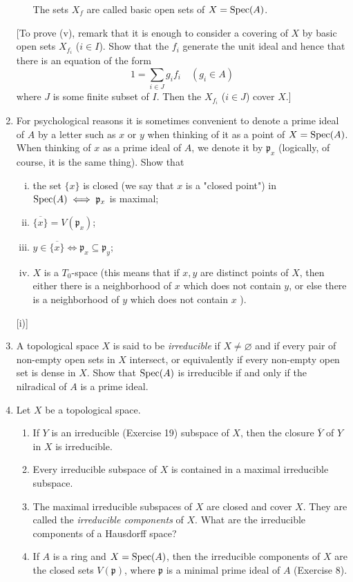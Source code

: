 \documentclass[class=book, crop=false]{standalone}
\theoremstyle{definition}
\theoremstyle{remark}
\begin{document}
\begin{enumerate}[resume*=exc1]
\begin{enumerate}[i)]
The sets $X_{f}$ are called basic open sets of $X=\operatorname{Spec}(A)$.
\end{enumerate}
[To prove (v), remark that it is enough to consider a covering of $X$ by basic
open sets $X_{f_{i}}$ ($i \in I$). Show that the $f_{i}$ generate the unit ideal
and hence that there is an equation of the form
\[
  1=\sum_{i \in J} g_{i} f_{i} \quad\left(g_{i} \in A\right)
\]
where $J$ is some finite subset of $I$. Then the $X_{f_{i}}$ ($i \in J$) cover
$X$.]

\item For psychological reasons it is sometimes convenient to denote a prime
ideal of $A$ by a letter such as $x$ or $y$ when thinking of it as a point of
$X=\operatorname{Spec}(A)$. When thinking of $x$ as a prime ideal of $A$, we
denote it by $\mathfrak{p}_{x}$ (logically, of course, it is the same thing).
Show that
\begin{enumerate}[i)]
  \item the set $\{x\}$ is closed (we say that $x$ is a "closed point") in
$\operatorname{Spec}(A) \iff \mathfrak{p}_{x}$ is maximal;
  \item $\overline{\{x\}}=V\left(\mathfrak{p}_{x}\right)$;
  \item $y \in \overline{\{x\}} \iff \mathfrak{p}_{x} \subseteq \mathfrak{p}_{y}$;
  \item $X$ is a $T_{0}$-space (this means that if $x, y$ are distinct points of
$X$, then either there is a neighborhood of $x$ which does not contain $y$, or
else there is a neighborhood of $y$ which does not contain $x$ ).
\end{enumerate}[i)]
  \item A topological space $X$ is said to be \textit{irreducible} if
        $X \neq \varnothing$ and if every pair of non-empty open sets in $X$
        intersect, or equivalently if every non-empty open set is dense in $X$.
        Show that $\operatorname{Spec}(A)$ is irreducible if and only if the
        nilradical of $A$ is a prime ideal.

  \item Let $X$ be a topological space.
\begin{enumerate}
  \item If $Y$ is an irreducible (Exercise 19) subspace of $X$, then the closure
$\overline{Y}$ of $Y$ in $X$ is irreducible.
  \item Every irreducible subspace of $X$ is contained in a maximal irreducible
subspace.
  \item The maximal irreducible subspaces of $X$ are closed and cover $X$. They are
called the \textit{irreducible components} of $X$. What are the irreducible components of
a Hausdorff space?
  \item If $A$ is a ring and $X=\operatorname{Spec}(A)$, then the irreducible
components of $X$ are the closed sets $V(\mathfrak{p})$, where $\mathfrak{p}$ is
a minimal prime ideal of $A$ (Exercise 8).
\end{enumerate}


\end{enumerate}
\end{document}
